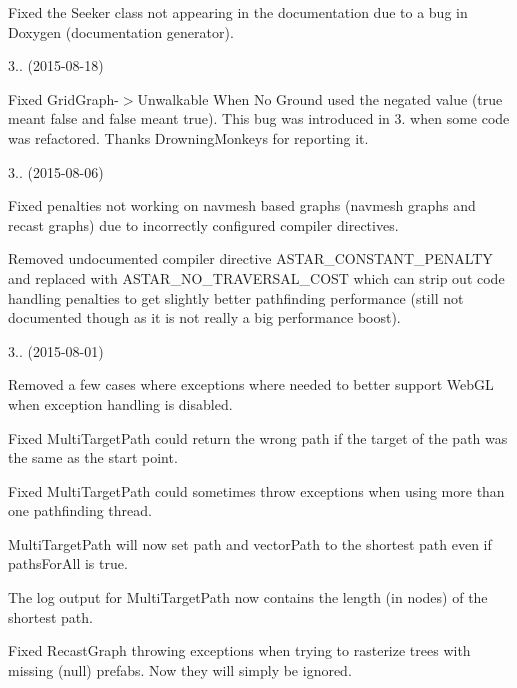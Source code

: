 \begin{DoxyItemize}
\begin{DoxyItemize}
\begin{DoxyItemize}
\item Fixed the Seeker class not appearing in the documentation due to a bug in Doxygen (documentation generator).
\end{DoxyItemize}
\end{DoxyItemize}
\item 3.. (2015-\/08-\/18)
\begin{DoxyItemize}
\item Fixed Grid\+Graph-\/$>$Unwalkable When No Ground used the negated value (true meant false and false meant true). This bug was introduced in 3. when some code was refactored. Thanks Drowning\+Monkeys for reporting it.
\end{DoxyItemize}
\item 3.. (2015-\/08-\/06)
\begin{DoxyItemize}
\item Fixed penalties not working on navmesh based graphs (navmesh graphs and recast graphs) due to incorrectly configured compiler directives.
\item Removed undocumented compiler directive A\+S\+T\+A\+R\+\_\+\+C\+O\+N\+S\+T\+A\+N\+T\+\_\+\+P\+E\+N\+A\+L\+TY and replaced with A\+S\+T\+A\+R\+\_\+\+N\+O\+\_\+\+T\+R\+A\+V\+E\+R\+S\+A\+L\+\_\+\+C\+O\+ST which can strip out code handling penalties to get slightly better pathfinding performance (still not documented though as it is not really a big performance boost).
\end{DoxyItemize}
\item 3.. (2015-\/08-\/01)
\begin{DoxyItemize}
\item Removed a few cases where exceptions where needed to better support Web\+GL when exception handling is disabled.
\item Fixed Multi\+Target\+Path could return the wrong path if the target of the path was the same as the start point.
\item Fixed Multi\+Target\+Path could sometimes throw exceptions when using more than one pathfinding thread.
\item Multi\+Target\+Path will now set path and vector\+Path to the shortest path even if paths\+For\+All is true.
\item The log output for Multi\+Target\+Path now contains the length (in nodes) of the shortest path.
\item Fixed Recast\+Graph throwing exceptions when trying to rasterize trees with missing (null) prefabs. Now they will simply be ignored.

\end{DoxyItemize}
\end{DoxyItemize}
